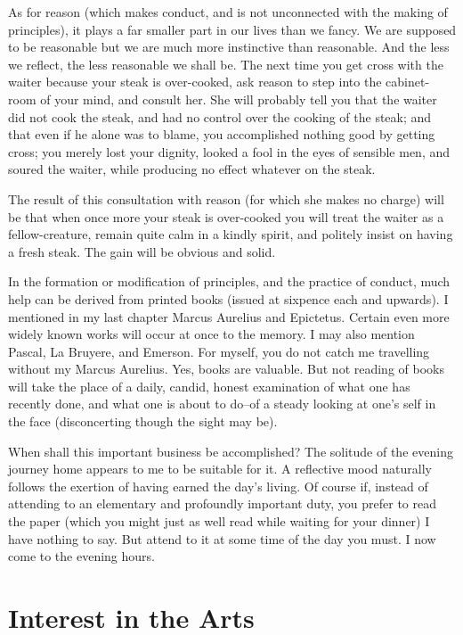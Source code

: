 As for reason (which makes conduct, and is not unconnected with the
making of principles), it plays a far smaller part in our lives than we
fancy.  We are supposed to be reasonable but we are much more
instinctive than reasonable. And the less we reflect, the less
reasonable we shall be.  The next time you get cross with the waiter
because your steak is over-cooked, ask reason to step into the
cabinet-room of your mind, and consult her.  She will probably tell you
that the waiter did not cook the steak, and had no control over the
cooking of the steak; and that even if he alone was to blame, you
accomplished nothing good by getting cross; you merely lost your
dignity, looked a fool in the eyes of sensible men, and soured the
waiter, while producing no effect whatever on the steak.

The result of this consultation with reason (for which she makes no
charge) will be that when once more your steak is over-cooked you will
treat the waiter as a fellow-creature, remain quite calm in a kindly
spirit, and politely insist on having a fresh steak.  The gain will be
obvious and solid.

In the formation or modification of principles, and the practice of
conduct, much help can be derived from printed books (issued at
sixpence each and upwards).  I mentioned in my last chapter Marcus
Aurelius and Epictetus. Certain even more widely known works will occur
at once to the memory. I may also mention Pascal, La Bruyere, and
Emerson.  For myself, you do not catch me travelling without my Marcus
Aurelius.  Yes, books are valuable.  But not reading of books will take
the place of a daily, candid, honest examination of what one has
recently done, and what one is about to do--of a steady looking at
one's self in the face (disconcerting though the sight may be).

When shall this important business be accomplished?  The solitude of
the evening journey home appears to me to be suitable for it.  A
reflective mood naturally follows the exertion of having earned the
day's living. Of course if, instead of attending to an elementary and
profoundly important duty, you prefer to read the paper (which you
might just as well read while waiting for your dinner) I have nothing
to say.  But attend to it at some time of the day you must. I now come
to the evening hours.



\addtocounter{chapter}{1}\chapter*{Interest in the Arts}

